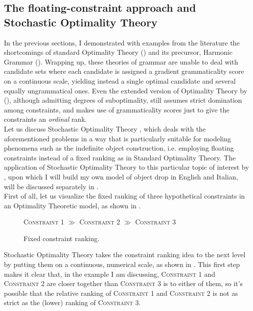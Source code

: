 \subsection{The floating-constraint approach and Stochastic Optimality Theory}  %

In the previous sections, I demonstrated with examples from the literature the shortcomings of standard Optimality Theory () and its precursor, Harmonic Grammar (). Wrapping up, these theories of grammar are unable to deal with candidate sets where each candidate is assigned a gradient grammaticality score on a continuous scale, yielding instead a single optimal candidate and several equally ungrammatical ones. Even the extended version of Optimality Theory by \textcite{keller1997extraction} (), although admitting degrees of suboptimality, still assumes strict domination among constraints, and makes use of grammaticality scores just to give the constraints an \textit{ordinal} rank.\\
Let us discuss Stochastic Optimality Theory \parencite{BoersmaHayes2001empirical, boersma1997we}, which deals with the aforementioned problems in a way that is particularly suitable for modeling phenomena such as the indefinite object construction, i.e. employing floating constraints instead of a fixed ranking as in Standard Optimality Theory. The application of Stochastic Optimality Theory to this particular topic of interest by \textcite{Medina2007}, upon which I will build my own model of object drop in English and Italian, will be discussed separately in .\\
First of all, let us visualize the fixed ranking of three hypothetical constraints in an Optimality Theoretic model, as shown in . 

\begin{figure}[htb]
\caption{Fixed constraint ranking.}
\textsc{Constraint 1} $\gg$ \textsc{Constraint 2} $\gg$ \textsc{Constraint 3}
\end{figure}

Stochastic Optimality Theory takes the constraint ranking idea to the next level by putting them on a continuous, numerical scale, as shown in . This first step makes it clear that, in the example I am discussing, \textsc{Constraint 1} and \textsc{Constraint 2} are closer together than \textsc{Constraint 3} is to either of them, so it's possible that the relative ranking of \textsc{Constraint 1} and \textsc{Constraint 2} is not as strict as the (lower) ranking of \textsc{Constraint 3}.

